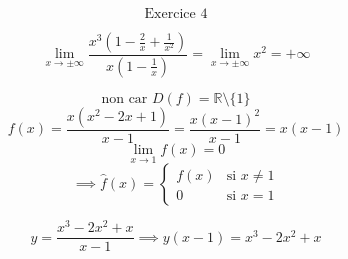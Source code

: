 \documentclass{article}
\begin{document}
\[ \text{Exercice 4} \]

\[ \lim_{x \to \pm\infty} \frac{x^3(1 - \frac{2}{x} + \frac{1}{x^2})}{x(1 - \frac{1}{x})} = \lim_{x \to \pm\infty} x^2 = +\infty \]

\[ \text{non car } D(f) = \mathbb{R} \setminus \{1\} \]
\[ f(x) = \frac{x(x^2 - 2x + 1)}{x - 1} = \frac{x(x - 1)^2}{x - 1} = x(x - 1) \]
\[ \lim_{x \to 1} f(x) = 0 \]
\[ \implies \hat{f}(x) = \begin{cases} f(x) & \text{si } x \ne 1 \\ 0 & \text{si } x = 1 \end{cases} \]

\[ y = \frac{x^3 - 2x^2 + x}{x - 1} \implies y(x - 1) = x^3 - 2x^2 + x \]
\end{document}
